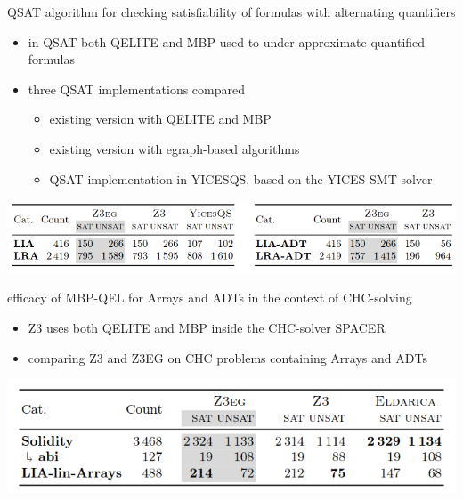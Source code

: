 \documentclass{beamer}
\begin{document}
\begin{frame}{QSAT algorithm for checking satisfiability of formulas with
alternating quantifiers}

\begin{itemize}
    \item in QSAT both QELITE and MBP used to under-approximate quantified formulas
    \item three QSAT implementations compared
    \begin{itemize}
        \item existing version with QELITE and MBP
        \item existing version with egraph-based algorithms
        \item QSAT implementation in YICESQS, based on the YICES SMT solver
    \end{itemize}
\end{itemize}

\pause

\begin{center}
\includegraphics[scale=0.35]{FMI3.png}
\end{center}

\end{frame}

\begin{frame}{efficacy of MBP-QEL for Arrays and ADTs in the context of
CHC-solving}

\begin{itemize}
    \item Z3 uses both QELITE and MBP inside the CHC-solver SPACER
    \item comparing Z3 and Z3EG on CHC problems containing Arrays and ADTs
\end{itemize}

\pause

\begin{center}
\includegraphics[scale=0.35]{FMI4.png}
\end{center}

\end{frame}
\end{document}
